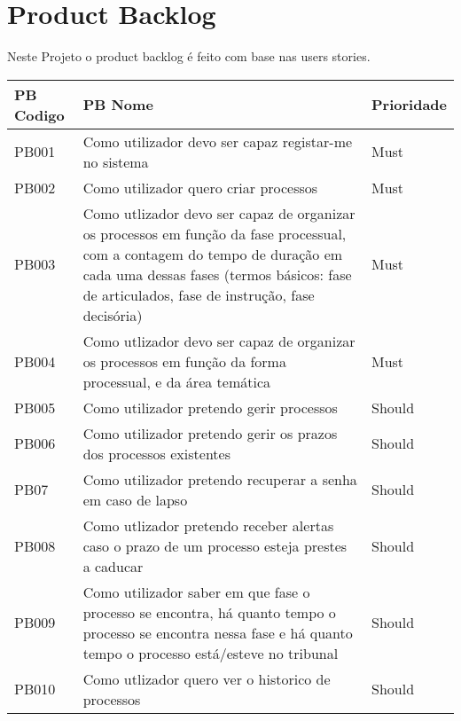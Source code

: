 \section{Product Backlog}

\indent \par Neste Projeto o product backlog é feito com  base nas users stories.

			\begin{center}
				\begin{tabular}{ | m{6em} | m{10cm}| m{2cm} | }
					\hline
						    PB Codigo 	& PB Nome & Prioridade \\
						        \hline
						    PB001 & Como utilizador devo ser capaz registar-me no sistema & Must \\
						        \hline
                            PB002 & Como utilizador quero criar processos & Must \\
                            	\hline
                            PB003 & Como utlizador devo ser capaz de organizar os processos em função da fase processual, com a contagem do tempo de duração em cada uma dessas fases (termos básicos: fase de articulados, fase de instrução, fase decisória) & Must\\
                            	\hline
                            PB004 & Como utlizador devo ser capaz de organizar os processos em função da forma processual, e da área temática & Must\\
                                \hline
                            PB005 & Como utilizador pretendo gerir processos & Should\\
                            	\hline
                            PB006 & Como utilizador pretendo gerir os prazos dos processos existentes & Should\\
                                \hline
                            PB07 & Como utilizador pretendo recuperar a senha em caso de lapso & Should\\
                                \hline
                            PB008 & Como utlizador pretendo receber alertas caso o prazo de um processo esteja prestes a caducar & Should \\
                                \hline
                            PB009 & Como utilizador saber em que fase o processo se encontra, há quanto tempo o processo se encontra nessa fase e há quanto tempo o processo está/esteve no tribunal  & Should\\
                            	\hline
                            PB010 & Como utlizador quero ver o historico de processos & Should \\

\end{tabular}
\end{center}
